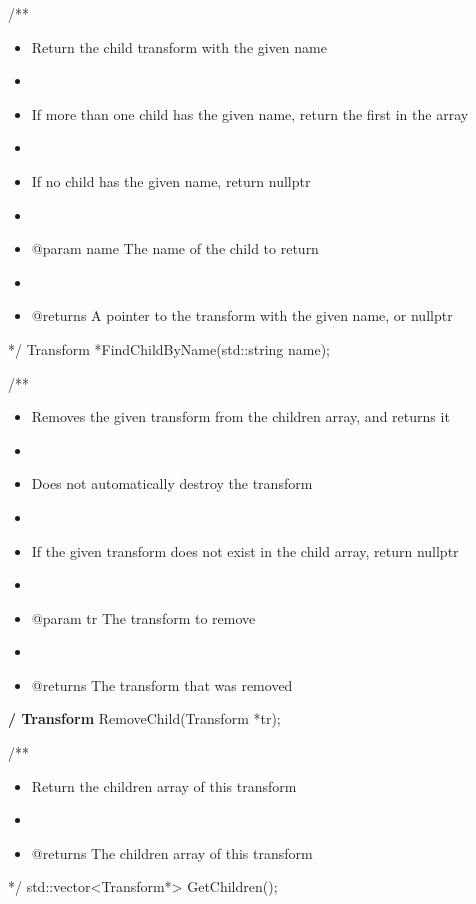 \documentclass[11pt]{article}
\begin{document}
/**
\begin{itemize}
\item Return the child transform with the given name
\item 

\item If more than one child has the given name, return the first in the array
\item 

\item If no child has the given name, return nullptr
\item 

\item @param name The name of the child to return
\item 

\item @returns A pointer to the transform with the given name, or nullptr
\end{itemize}
 */
Transform *FindChildByName(std::string name);

/**
\begin{itemize}
\item Removes the given transform from the children array, and returns it
\item 

\item Does not automatically destroy the transform
\item 

\item If the given transform does not exist in the child array, return nullptr
\item 

\item @param tr The transform to remove
\item 

\item @returns The transform that was removed
\end{itemize}
 \textbf{/
Transform} RemoveChild(Transform *tr);



/**
\begin{itemize}
\item Return the children array of this transform
\item 

\item @returns The children array of this transform
\end{itemize}
 */
std::vector<Transform*> GetChildren();
\end{document}

